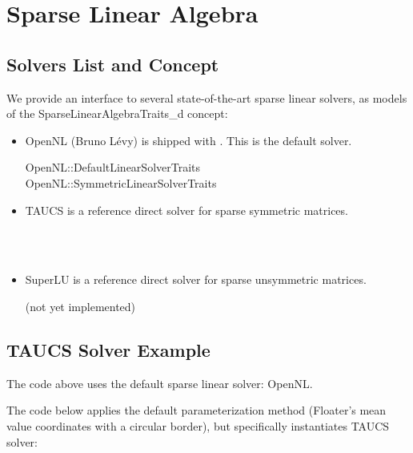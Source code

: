 \section{Sparse Linear Algebra}

\subsection{Solvers List and Concept}

We provide an interface to several state-of-the-art
sparse linear solvers, as models of the SparseLinearAlgebraTraits\_d concept:

\begin{itemize}

\item OpenNL (Bruno L{\'e}vy) is shipped with \cgal. This is the default solver.

OpenNL::DefaultLinearSolverTraits  \\
OpenNL::SymmetricLinearSolverTraits  \\

\item TAUCS is a reference direct solver for sparse symmetric matrices.

  \\
  \\

\item SuperLU is a reference direct solver for sparse unsymmetric matrices.

(not yet implemented)

\end{itemize}


\subsection{TAUCS Solver Example}

The code above uses the default sparse linear solver: OpenNL.

The code below applies the default parameterization method
(Floater's mean value coordinates with a circular border),
but specifically instantiates TAUCS solver:

